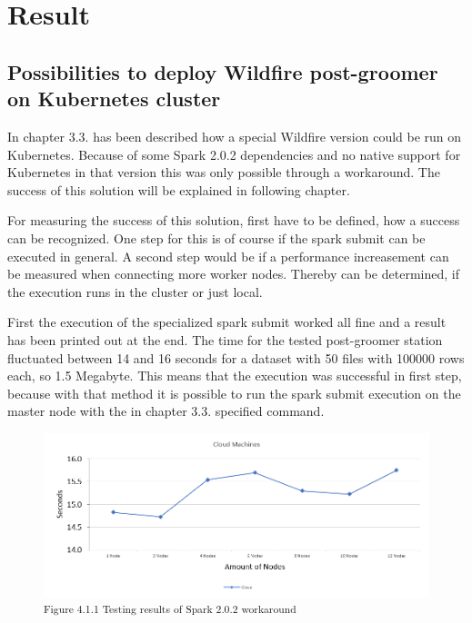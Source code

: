 
\chapter{Result}

\section{Possibilities to deploy Wildfire post-groomer on Kubernetes cluster}

In chapter 3.3. has been described how a special Wildfire version could be run on Kubernetes. Because of some Spark 2.0.2 dependencies and no native support for Kubernetes in that version this was only possible through a workaround. The success of this solution will be explained in following chapter.

For measuring the success of this solution, first have to be defined, how a success can be recognized. One step for this is of course if the spark submit can be executed in general. A second step would be if a performance increasement can be measured when connecting more worker nodes. Thereby can be determined, if the execution runs in the cluster or just local.

First the execution of the specialized spark submit worked all fine and a result has been printed out at the end. The time for the tested post-groomer station fluctuated between 14 and 16 seconds for a dataset with 50 files with 100000 rows each, so 1.5 Megabyte. This means that the execution was successful in first step, because with that method it is possible to run the spark submit execution on the master node with the in chapter 3.3. specified command.

\begin{figure}[b]
\centering
\includegraphics[width=\textwidth/4*3]{images/workaround_testing_results.png}
\textsuperscript{Figure 4.1.1 Testing results of Spark 2.0.2 workaround}
\end{figure}

